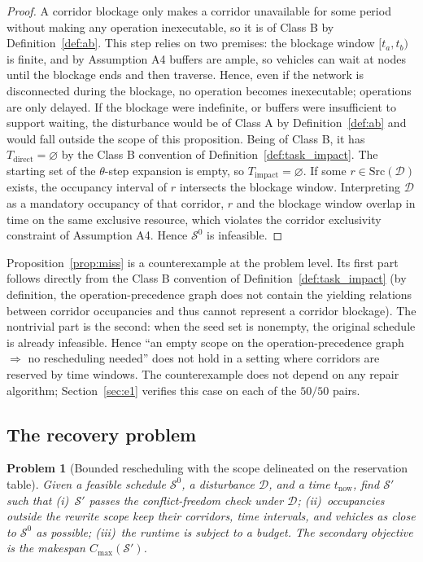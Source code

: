 \documentclass[manuscript,screen,review]{acmart}
\newcommand{\NPairs}{50}
\newcommand{\PassMiss}{\NPairs/\NPairs}      %
\newtheorem{problem}{Problem}
\begin{document}
\begin{proof}
A corridor blockage only makes a corridor unavailable for some period without making any operation inexecutable, so it is of Class B by Definition~\ref{def:ab}.
This step relies on two premises: the blockage window \([t_a,t_b)\) is finite, and by Assumption A4 buffers are ample, so vehicles can wait at nodes until the blockage ends and then traverse.
Hence, even if the network is disconnected during the blockage, no operation becomes inexecutable; operations are only delayed. If the blockage were indefinite,
or buffers were insufficient to support waiting, the disturbance would be of Class A by Definition~\ref{def:ab} and would fall outside the scope of this proposition.
Being of Class B,
it has \(T_{\mathrm{direct}}=\varnothing\) by the Class B convention of Definition~\ref{def:task_impact}.
The starting set of the \(\theta\)-step expansion is empty, so \(T_{\mathrm{impact}}=\varnothing\).
If some \(r\in\mathrm{Src}(\mathcal{D})\) exists, the occupancy interval of \(r\) intersects the blockage window.
Interpreting \(\mathcal{D}\) as a mandatory occupancy of that corridor, \(r\) and the blockage window overlap in time on the same exclusive resource,
which violates the corridor exclusivity constraint of Assumption A4. Hence \(\mathcal{S}^0\) is infeasible.
\end{proof}

Proposition~\ref{prop:miss} is a counterexample at the problem level. Its first part follows directly from the Class B convention of Definition~\ref{def:task_impact}
(by definition, the operation-precedence graph does not contain the yielding relations between corridor occupancies and thus cannot represent a corridor blockage).
The nontrivial part is the second: when the seed set is nonempty, the original schedule is already infeasible.
Hence ``an empty scope on the operation-precedence graph \(\Rightarrow\) no rescheduling needed'' does not hold in a setting where corridors are reserved by time windows.
The counterexample does not depend on any repair algorithm; Section~\ref{sec:e1} verifies this case on each of the \(\PassMiss\) pairs.

\subsection{The recovery problem}
\label{sec:recovery_problem}

\begin{problem}[Bounded rescheduling with the scope delineated on the reservation table]
\label{prob:recovery}
Given a feasible schedule \(\mathcal{S}^0\), a disturbance \(\mathcal{D}\), and a time \(t_{\mathrm{now}}\),
find \(\mathcal{S}'\) such that
(i)~\(\mathcal{S}'\) passes the conflict-freedom check under \(\mathcal{D}\);
(ii)~occupancies outside the rewrite scope keep their corridors, time intervals, and vehicles as close to \(\mathcal{S}^0\) as possible;
(iii)~the runtime is subject to a budget.
The secondary objective is the makespan \(C_{\max}(\mathcal{S}')\).
\end{problem}
\end{document}
